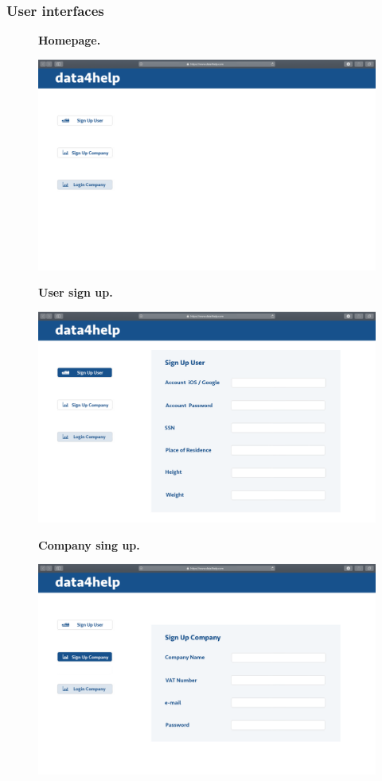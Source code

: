 \documentclass{article}
\begin{document}
\subsubsection{User interfaces}
\begin{figure}[h!]
\centering
    \textbf{Homepage.}\par\medskip
	\includegraphics[width= \linewidth]{1homepage.png}
\end{figure}
\begin{figure}[h!]
\centering
    \textbf{User sign up.}\par\medskip
	\includegraphics[width= \linewidth]{2signupuser.png}
\end{figure}\newpage
\begin{figure}[h!]
\centering
    \textbf{Company sing up.}\par\medskip
	\includegraphics[width= \linewidth]{3signupcompany.png}
\end{figure}
\end{document}
